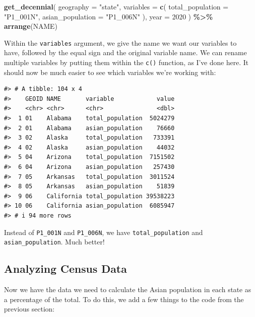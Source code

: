 \documentclass[
]{book}
\newenvironment{Shaded}{\begin{snugshade}}{\end{snugshade}}
\newcommand{\AttributeTok}[1]{\textcolor[rgb]{0.13,0.29,0.53}{#1}}
\newcommand{\DecValTok}[1]{\textcolor[rgb]{0.00,0.00,0.81}{#1}}
\newcommand{\FunctionTok}[1]{\textcolor[rgb]{0.13,0.29,0.53}{\textbf{#1}}}
\newcommand{\NormalTok}[1]{#1}
\newcommand{\SpecialCharTok}[1]{\textcolor[rgb]{0.81,0.36,0.00}{\textbf{#1}}}
\newcommand{\StringTok}[1]{\textcolor[rgb]{0.31,0.60,0.02}{#1}}
\begin{document}
\begin{Shaded}
\begin{Highlighting}[]
\FunctionTok{get\_decennial}\NormalTok{(}
  \AttributeTok{geography =} \StringTok{"state"}\NormalTok{,}
  \AttributeTok{variables =} \FunctionTok{c}\NormalTok{(}
    \AttributeTok{total\_population =} \StringTok{"P1\_001N"}\NormalTok{,}
    \AttributeTok{asian\_population =} \StringTok{"P1\_006N"}
\NormalTok{  ),}
  \AttributeTok{year =} \DecValTok{2020}
\NormalTok{) }\SpecialCharTok{\%\textgreater{}\%}
  \FunctionTok{arrange}\NormalTok{(NAME)}
\end{Highlighting}
\end{Shaded}

Within the \texttt{variables} argument, we give the name we want our variables to have, followed by the equal sign and the original variable name. We can rename multiple variables by putting them within the \texttt{c()} function, as I've done here. It should now be much easier to see which variables we're working with:

\begin{verbatim}
#> # A tibble: 104 x 4
#>    GEOID NAME       variable            value
#>    <chr> <chr>      <chr>               <dbl>
#>  1 01    Alabama    total_population  5024279
#>  2 01    Alabama    asian_population    76660
#>  3 02    Alaska     total_population   733391
#>  4 02    Alaska     asian_population    44032
#>  5 04    Arizona    total_population  7151502
#>  6 04    Arizona    asian_population   257430
#>  7 05    Arkansas   total_population  3011524
#>  8 05    Arkansas   asian_population    51839
#>  9 06    California total_population 39538223
#> 10 06    California asian_population  6085947
#> # i 94 more rows
\end{verbatim}

Instead of \texttt{P1\_001N} and \texttt{P1\_006N}, we have \texttt{total\_population} and \texttt{asian\_population}. Much better!

\hypertarget{analyzing-census-data}{%
\subsection*{Analyzing Census Data}\label{analyzing-census-data}}

Now we have the data we need to calculate the Asian population in each state as a percentage of the total. To do this, we add a few things to the code from the previous section:
\end{document}
